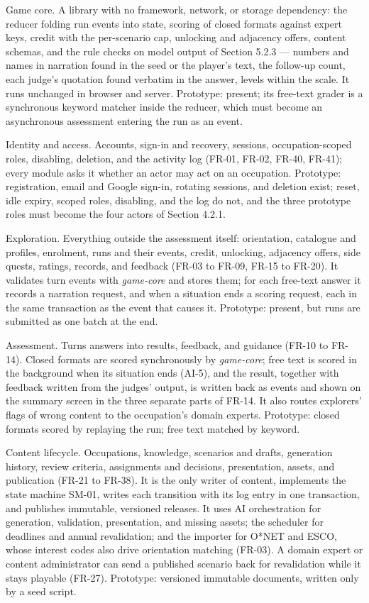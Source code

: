 Game core. A library with no framework, network, or storage dependency: the reducer folding run events into state, scoring of closed formats against expert keys, credit with the per-scenario cap, unlocking and adjacency offers, content schemas, and the rule checks on model output of Section 5.2.3 --- numbers and names in narration found in the seed or the player's text, the follow-up count, each judge's quotation found verbatim in the answer, levels within the scale. It runs unchanged in browser and server. Prototype: present; its free-text grader is a synchronous keyword matcher inside the reducer, which must become an asynchronous assessment entering the run as an event.

Identity and access. Accounts, sign-in and recovery, sessions, occupation-scoped roles, disabling, deletion, and the activity log (FR-01, FR-02, FR-40, FR-41); every module asks it whether an actor may act on an occupation. Prototype: registration, email and Google sign-in, rotating sessions, and deletion exist; reset, idle expiry, scoped roles, disabling, and the log do not, and the three prototype roles must become the four actors of Section 4.2.1.

Exploration. Everything outside the assessment itself: orientation, catalogue and profiles, enrolment, runs and their events, credit, unlocking, adjacency offers, side quests, ratings, records, and feedback (FR-03 to FR-09, FR-15 to FR-20). It validates turn events with \textit{game-core} and stores them; for each free-text answer it records a narration request, and when a situation ends a scoring request, each in the same transaction as the event that causes it. Prototype: present, but runs are submitted as one batch at the end.

Assessment. Turns answers into results, feedback, and guidance (FR-10 to FR-14). Closed formats are scored synchronously by \textit{game-core}; free text is scored in the background when its situation ends (AI-5), and the result, together with feedback written from the judges' output, is written back as events and shown on the summary screen in the three separate parts of FR-14. It also routes explorers' flags of wrong content to the occupation's domain experts. Prototype: closed formats scored by replaying the run; free text matched by keyword.

Content lifecycle. Occupations, knowledge, scenarios and drafts, generation history, review criteria, assignments and decisions, presentation, assets, and publication (FR-21 to FR-38). It is the only writer of content, implements the state machine SM-01, writes each transition with its log entry in one transaction, and publishes immutable, versioned releases. It uses AI orchestration for generation, validation, presentation, and missing assets; the scheduler for deadlines and annual revalidation; and the importer for O*NET and ESCO, whose interest codes also drive orientation matching (FR-03). A domain expert or content administrator can send a published scenario back for revalidation while it stays playable (FR-27). Prototype: versioned immutable documents, written only by a seed script.

